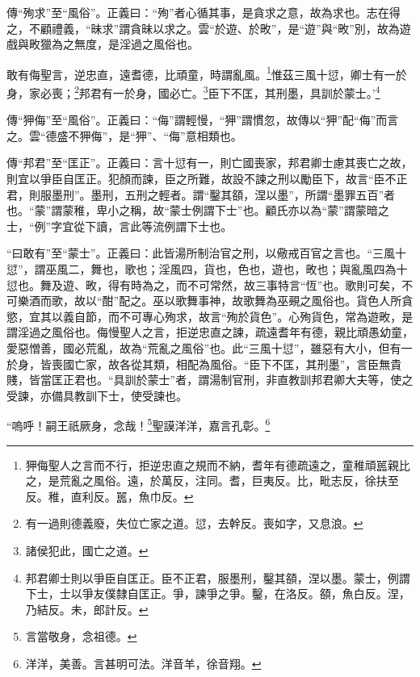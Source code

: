 {\noindent\zhuan{}\fzbyks 傳“殉求”至“風俗”。正義曰：“殉”者心循其事，是貪求之意，故為求也。志在得之，不顧禮義，“昧求”謂貪昧以求之。雲“於遊、於畋”，是“遊”與“畋”別，故為遊戲與畋獵為之無度，是淫過之風俗也。 \par}

敢有侮聖言，逆忠直，遠耆德，比頑童，時謂亂風。\footnote{狎侮聖人之言而不行，拒逆忠直之規而不納，耆年有德疏遠之，童稚頑嚚親比之，是荒亂之風俗。遠，於萬反，注同。耆，巨夷反。比，毗志反，徐扶至反。稚，直利反。嚚，魚巾反。}惟茲三風十愆，卿士有一於身，家必喪；\footnote{有一過則德義廢，失位亡家之道。愆，去幹反。喪如字，又息浪。}邦君有一於身，國必亡。\footnote{諸侯犯此，國亡之道。}臣下不匡，其刑墨，具訓於蒙士。’\footnote{邦君卿士則以爭臣自匡正。臣不正君，服墨刑，鑿其頟，涅以墨。蒙士，例謂下士，士以爭友僕隸自匡正。爭，諫爭之爭。鑿，在洛反。頟，魚白反。涅，乃結反。未，郎計反。}

{\noindent\zhuan{}\fzbyks 傳“狎侮”至“風俗”。正義曰：“侮”謂輕慢，“狎”謂慣忽，故傳以“狎”配“侮”而言之。雲“德盛不狎侮”，是“狎”、“侮”意相類也。 \par}

{\noindent\zhuan{}\fzbyks 傳“邦君”至“匡正”。正義曰：言十愆有一，則亡國喪家，邦君卿士慮其喪亡之故，則宜以爭臣自匡正。犯顏而諫，臣之所難，故設不諫之刑以勵臣下，故言“臣不正君，則服墨刑”。墨刑，五刑之輕者。謂“鑿其頟，涅以墨”，所謂“墨罪五百”者也。“蒙”謂蒙稚，卑小之稱，故“蒙士例謂下士”也。顧氏亦以為“蒙”謂蒙暗之士，“例”字宜從下讀，言此等流例謂下士也。 \par}

{\noindent\shu{}\fzkt “曰敢有”至“蒙士”。正義曰：此皆湯所制治官之刑，以儆戒百官之言也。“三風十愆”，謂巫風二，舞也，歌也；淫風四，貨也，色也，遊也，畋也；與亂風四為十愆也。舞及遊、畋，得有時為之，而不可常然，故三事特言“恆”也。歌則可矣，不可樂酒而歌，故以“酣”配之。巫以歌舞事神，故歌舞為巫覡之風俗也。貨色人所貪慾，宜其以義自節，而不可專心殉求，故言“殉於貨色”。心殉貨色，常為遊畋，是謂淫過之風俗也。侮慢聖人之言，拒逆忠直之諫，疏遠耆年有德，親比頑愚幼童，愛惡憎善，國必荒亂，故為“荒亂之風俗”也。此“三風十愆”，雖惡有大小，但有一於身，皆喪國亡家，故各從其類，相配為風俗。“臣下不匡，其刑墨”，言臣無貴賤，皆當匡正君也。“具訓於蒙士”者，謂湯制官刑，非直教訓邦君卿大夫等，使之受諫，亦備具教訓下士，使受諫也。 \par}

“嗚呼！嗣王祇厥身，念哉！\footnote{言當敬身，念祖德。}聖謨洋洋，嘉言孔彰。\footnote{洋洋，美善。言甚明可法。洋音羊，徐音翔。}

